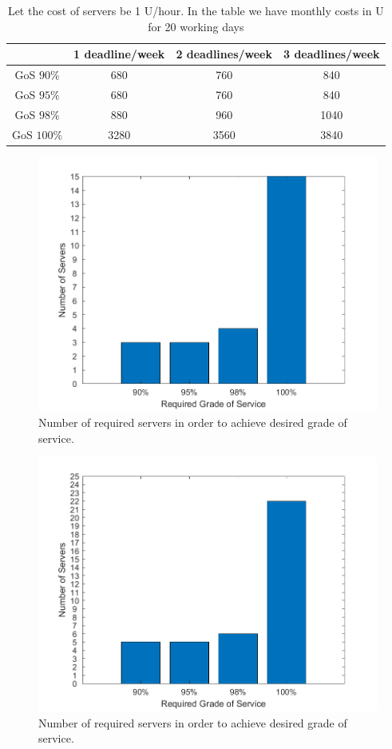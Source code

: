 \documentclass[a4paper]{article}
\begin{document}
\begin{table}
\begin{tabular}{ c c c  c }
& 1 deadline/week & 2 deadlines/week & 3 deadlines/week \\ \hline
 GoS $90\%$ & 680 & 760& 840 \\ 
 GoS $95\%$& 680 & 760 & 840\\  
 GoS $98\%$ & 880 & 960 & 1040 \\
 GoS $100\%$ & 3280 & 3560 & 3840 \\
\end{tabular}
\caption{Let the cost of servers be 1 U/hour. In the table we have monthly costs in U for 20 working days}
\end{table}

\begin{figure}[h!]
\includegraphics[scale=0.7]{plots/Question1_nodeadline.png}
\caption{Number of required servers in order to achieve desired grade of service.}
\label{no_deadline}
\end{figure}  

\begin{figure}[h!]
\includegraphics[scale=0.7]{plots/Question1_deadline.png}
\caption{Number of required servers in order to achieve desired grade of service.}
\label{deadline}
\end{figure}  
\end{document}
